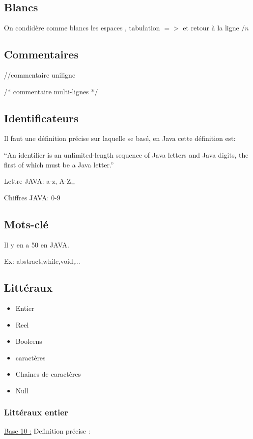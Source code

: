 \documentclass[a4paper,10pt]{report}
\begin{document}
      \subsection{Blancs}
      On condidère comme blancs les espaces , tabulation $=>$ et retour à la ligne $/n$
      
      \subsection{Commentaires}
      
      //commentaire uniligne
      
      /* commentaire multi-lignes */
      
      \subsection{Identificateurs}
      
      Il faut une définition précise sur laquelle se basé, en Java cette définition est:
      
      ``An identifier is an unlimited-length sequence of Java letters and Java digits, the first of which must be a Java letter.''
      
      Lettre JAVA: a-z, A-Z,\textunderscore,\textdollar
      
      Chiffres JAVA: 0-9
      
      \subsection{Mots-clé}
      
      Il y en a 50 en JAVA.
      
      Ex: abstract,while,void,...
      
      \subsection{Littéraux}
      \begin{itemize}
       \item Entier
       \item Reel
       \item Booleens
       \item caractères
       \item Chaines de caractères
       \item Null
      \end{itemize}
      
      \subsubsection{Littéraux entier}
      \underline{Base 10 :}
      Definition précise :
      
\end{document}
